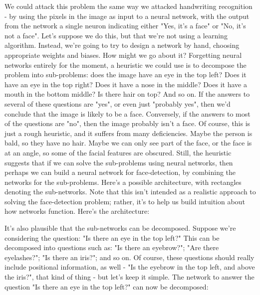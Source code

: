 We could attack this problem the same way we attacked handwriting recognition - by using the pixels in the image as input to a neural network, with the output from the network a single neuron indicating either "Yes, it's a face" or "No, it's not a face".
Let's suppose we do this, but that we're not using a learning algorithm. Instead, we're going to try to design a network by hand, choosing appropriate weights and biases. How might we go about it? Forgetting neural networks entirely for the moment, a heuristic we could use is to decompose the problem into sub-problems: does the image have an eye in the top left? Does it have an eye in the top right? Does it have a nose in the middle? Does it have a mouth in the bottom middle? Is there hair on top? And so on.
If the answers to several of these questions are "yes", or even just "probably yes", then we'd conclude that the image is likely to be a face. Conversely, if the answers to most of the questions are "no", then the image probably isn't a face.
Of course, this is just a rough heuristic, and it suffers from many deficiencies. Maybe the person is bald, so they have no hair. Maybe we can only see part of the face, or the face is at an angle, so some of the facial features are obscured. Still, the heuristic suggests that if we can solve the sub-problems using neural networks, then perhaps we can build a neural network for face-detection, by combining the networks for the sub-problems. Here's a possible architecture, with rectangles denoting the sub-networks. Note that this isn't intended as a realistic approach to solving the face-detection problem; rather, it's to help us build intuition about how networks function. Here's the architecture:

It's also plausible that the sub-networks can be decomposed. Suppose we're considering the question: "Is there an eye in the top left?" This can be decomposed into questions such as: "Is there an eyebrow?"; "Are there eyelashes?"; "Is there an iris?"; and so on. Of course, these questions should really include positional information, as well - "Is the eyebrow in the top left, and above the iris?", that kind of thing - but let's keep it simple. The network to answer the question "Is there an eye in the top left?" can now be decomposed:

